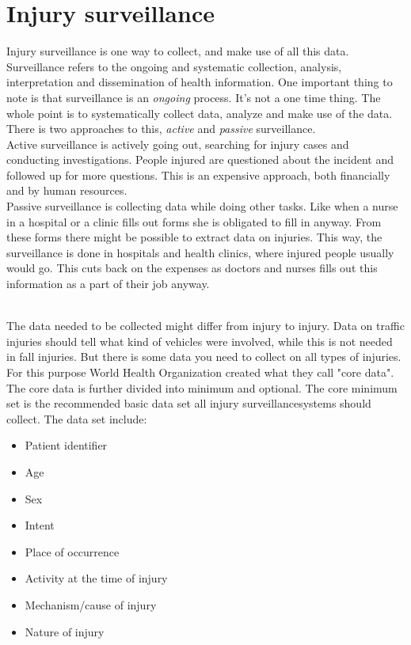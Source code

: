 \documentclass[UKenglish]{ifimaster}
\newcommand{\WHO}{World Health Organization }
\newcommand{\is}{injury surveillance}
\begin{document}
\section*{Injury surveillance}
Injury surveillance is one way to collect, and make use of all this data.
Surveillance refers to the ongoing and systematic collection, analysis, interpretation and dissemination of health information.\cite[11]{who-guide}
One important thing to note is that surveillance is an \textit{ongoing} process. It's not a one time thing. The whole point is to systematically collect data, analyze and make use of the data.
There is two approaches to this, \textit{active} and \textit{passive} surveillance. \\Active surveillance is actively going out, searching for injury cases and conducting investigations.
People injured are questioned about the incident and followed up for more questions. This is an expensive approach, both financially and by human resources. \\Passive surveillance is collecting data while doing other tasks. 
Like when a nurse in a hospital or a clinic fills out forms she is obligated to fill in anyway. From these forms there might be possible to extract data on injuries. This way, the surveillance is done in hospitals and health clinics, where injured people usually would go.
This cuts back on the expenses as doctors and nurses fills out this information as a part of their job anyway.

\\
The data needed to be collected might differ from injury to injury. Data on traffic injuries should tell
what kind of vehicles were involved, while this is not needed in fall injuries. But there is some data you need
to collect on all types of injuries. For this purpose \WHO created what they call "core data".\cite[25]{who-guide}
The core data is further divided into minimum and optional. The core minimum set is the recommended basic data set all \is systems should collect. The data set include:
\begin{itemize}
	\item Patient identifier
	\item Age 
	\item Sex
	\item Intent
	\item Place of occurrence
	\item Activity at the time of injury
	\item Mechanism/cause of injury
	\item Nature of injury
\end{itemize}
\end{document}
